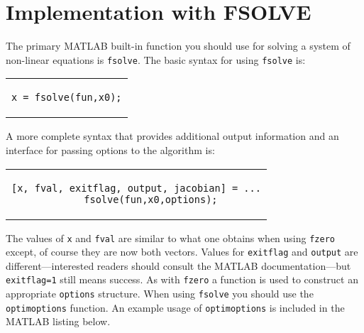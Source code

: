 \section{Implementation with FSOLVE}
The primary MATLAB built-in function you should use for solving a system of non-linear equations is \lstinline[style=myMatlab]{fsolve}.  The basic syntax for using \lstinline[style=myMatlab]{fsolve} is:
\begin{center}
\begin{tabular}{c}
\begin{lstlisting}[style=myMatlab, frame=none, numbers=none, basicstyle=\small]
x = fsolve(fun,x0);
\end{lstlisting}
\end{tabular}
\end{center}
A more complete syntax that provides additional output information and an interface for passing options to the algorithm is:
\begin{center}
\begin{tabular}{c}
\begin{lstlisting}[style=myMatlab, frame=none, numbers=none, basicstyle=\small]
[x, fval, exitflag, output, jacobian] = ...
     fsolve(fun,x0,options);
\end{lstlisting}
\end{tabular}
\end{center}
The values of \lstinline[style=myMatlab]{x} and \lstinline[style=myMatlab]{fval} are similar to what one obtains when using \lstinline[style=myMatlab]{fzero} except, of course they are now both vectors.  Values for \lstinline[style=myMatlab]{exitflag} and \lstinline[style=myMatlab]{output} are different---interested readers should consult the MATLAB documentation---but \lstinline[style=myMatlab]{exitflag=1} still means success.  As with \lstinline[style=myMatlab]{fzero} a function is used to construct an appropriate \lstinline[style=myMatlab]{options} structure.  When using \lstinline[style=myMatlab]{fsolve} you should use the \lstinline[style=myMatlab]{optimoptions} function. An example usage of \lstinline[style=myMatlab]{optimoptions} is included in the MATLAB listing below.

\vspace{3.0cm}

